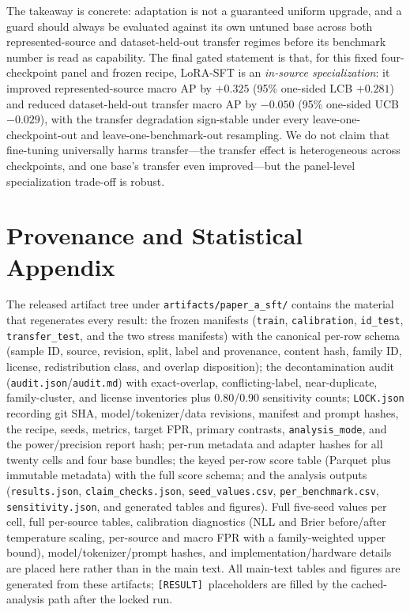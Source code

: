 \documentclass[sigconf,nonacm]{acmart}
\newcommand{\RES}{\texttt{[RESULT]}}
\begin{document}
The takeaway is concrete: adaptation is not a guaranteed uniform upgrade, and a guard should always be evaluated against its own untuned base across both represented-source and dataset-held-out transfer regimes before its benchmark number is read as capability. The final gated statement is that, for this fixed four-checkpoint panel and frozen recipe, LoRA-SFT is an \emph{in-source specialization}: it improved represented-source macro AP by $+0.325$ (95\% one-sided LCB $+0.281$) and reduced dataset-held-out transfer macro AP by $-0.050$ (95\% one-sided UCB $-0.029$), with the transfer degradation sign-stable under every leave-one-checkpoint-out and leave-one-benchmark-out resampling. We do not claim that fine-tuning universally harms transfer---the transfer effect is heterogeneous across checkpoints, and one base's transfer even improved---but the panel-level specialization trade-off is robust.

\appendix

\section{Provenance and Statistical Appendix}
\label{app:provenance}

The released artifact tree under \texttt{artifacts/paper\_a\_sft/} contains the material that regenerates every result: the frozen manifests (\texttt{train}, \texttt{calibration}, \texttt{id\_test}, \texttt{transfer\_test}, and the two stress manifests) with the canonical per-row schema (sample ID, source, revision, split, label and provenance, content hash, family ID, license, redistribution class, and overlap disposition); the decontamination audit (\texttt{audit.json}/\texttt{audit.md}) with exact-overlap, conflicting-label, near-duplicate, family-cluster, and license inventories plus 0.80/0.90 sensitivity counts; \texttt{LOCK.json} recording git SHA, model/tokenizer/data revisions, manifest and prompt hashes, the recipe, seeds, metrics, target FPR, primary contrasts, \texttt{analysis\_mode}, and the power/precision report hash; per-run metadata and adapter hashes for all twenty cells and four base bundles; the keyed per-row score table (Parquet plus immutable metadata) with the full score schema; and the analysis outputs (\texttt{results.json}, \texttt{claim\_checks.json}, \texttt{seed\_values.csv}, \texttt{per\_benchmark.csv}, \texttt{sensitivity.json}, and generated tables and figures). Full five-seed values per cell, full per-source tables, calibration diagnostics (NLL and Brier before/after temperature scaling, per-source and macro FPR with a family-weighted upper bound), model/tokenizer/prompt hashes, and implementation/hardware details are placed here rather than in the main text. All main-text tables and figures are generated from these artifacts; \RES\ placeholders are filled by the cached-analysis path after the locked run.
\end{document}
